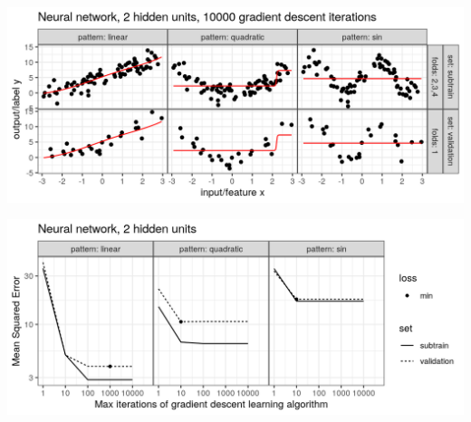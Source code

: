 \begin{frame}
  \includegraphics[width=\textwidth]{figure-overfitting-pred-units=2-maxit=10000.png}
\end{frame}


\begin{frame}
  \includegraphics[width=\textwidth]{figure-overfitting-data-loss-2.png}
\end{frame}

